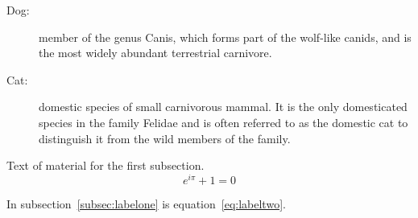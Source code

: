 \documentclass[twocolumn, chapterprefix, headings=big, numbers=enddot, ngerman]{scrreprt}
\begin{document}
\begin{description}
\item[Dog:] member of the genus Canis, which forms part of the wolf-like canids,
  and is the most widely abundant terrestrial carnivore.
\item[Cat:] domestic species of small carnivorous mammal. It is the only
  domesticated species in the family Felidae and is often referred to as the
  domestic cat to distinguish it from the wild members of the family.
\end{description}

Text of material for the first subsection.
\begin{equation}
  e^{i\pi}+1 = 0
\label{eq:labeltwo}
\end{equation}

In subsection~\ref{subsec:labelone} is equation~\ref{eq:labeltwo}.
\end{document}
